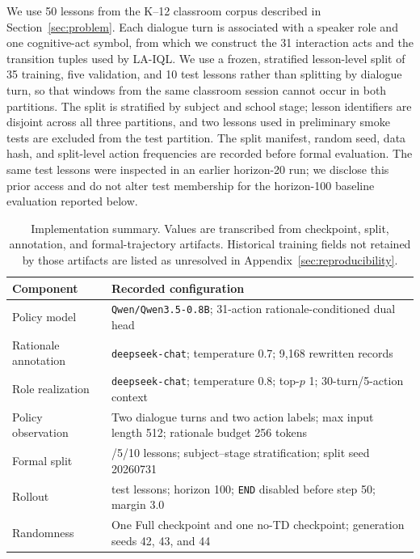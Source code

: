 \documentclass[manuscript,review,anonymous]{acmart}
\begin{document}
We use 50 lessons from the K--12 classroom corpus described in Section~\ref{sec:problem}.
Each dialogue turn is associated with a speaker role and one cognitive-act symbol, from which we construct the 31 interaction acts and the transition tuples used by LA-IQL.
We use a frozen, stratified lesson-level split of 35 training, five validation,
and 10 test lessons rather than splitting by dialogue turn, so
that windows from the same classroom session cannot occur in both partitions.
The split is stratified by subject and school stage; lesson identifiers are
disjoint across all three partitions, and two lessons used in preliminary
smoke tests are excluded from the test partition.  The split manifest, random
seed, data hash, and split-level action frequencies are recorded before formal
evaluation.  The same test lessons were inspected in an earlier
horizon-20 run; we disclose this prior access and do not alter test membership
for the horizon-100 baseline evaluation reported below.

\begin{table}[t]
\centering
\small
\begin{tabularx}{\columnwidth}{@{}>{\raggedright\arraybackslash}p{}>{\raggedright\arraybackslash}X@{}}
\toprule
Component & Recorded configuration \\
\midrule
Policy model & \texttt{Qwen/Qwen3.5-0.8B}; 31-action rationale-conditioned dual head \\
Rationale annotation & \texttt{deepseek-chat}; temperature 0.7; 9,168 rewritten records \\
Role realization & \texttt{deepseek-chat}; temperature 0.8; top-$p$ 1; 30-turn/5-action context \\
Policy observation & Two dialogue turns and two action labels; max input length 512; rationale budget 256 tokens \\
Formal split & 35/5/10 lessons; subject--stage stratification; split seed 20260731 \\
Rollout & 10 test lessons; horizon 100; \texttt{END} disabled before step 50; margin 3.0 \\
Randomness & One Full checkpoint and one no-TD checkpoint; generation seeds 42, 43, and 44 \\
\bottomrule
\end{tabularx}
\caption{Implementation summary. Values are transcribed from checkpoint,
split, annotation, and formal-trajectory artifacts. Historical training fields
not retained by those artifacts are listed as unresolved in
Appendix~\ref{sec:reproducibility}.}
\label{tab:implementation-summary}
\end{table}
\end{document}
